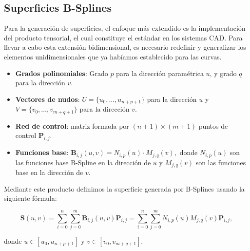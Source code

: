 \documentclass[11pt]{book}
\theoremstyle{plain} %
\theoremstyle{definition} %
\theoremstyle{definition} %
\begin{document}
\vspace{-0.5cm}

\subsection{Superficies B-Splines}
\label{subsec:Sup_B-Splines}

Para la generación de superficies, el enfoque más extendido es la implementación del producto tensorial, el cual constituye
el estándar en los sistemas CAD. Para llevar a cabo esta extensión bidimensional, es necesario redefinir y generalizar
los elementos unidimensionales que ya habíamos establecido para las curvas.

\vspace{-0.2cm}

    \begin{itemize}
        \item \textbf{Grados polinomiales}: Grado $p$ para la dirección paramétrica $u$, y grado $q$ para la dirección $v$.
        \item \textbf{Vectores de nudos}: $U = \{u_0, \dots, u_{n+p+1}\}$ para la dirección $u$ y $V = \{v_0, \dots, v_{m+q+1}\}$ para la dirección $v$.
        \item \textbf{Red de control}: matriz formada por $(n+1) \times (m+1)$ puntos de control $\mathbf{P}_{i,j}$.
        \item \textbf{Funciones base}: $\mathbf{B}_{i,j}(u, v) = N_{i,p}(u) \cdot M_{j,q}(v),$ donde  $N_{i,p}(u)$ son las funciones 
        base B-Spline en la dirección de $u$ y $M_{j,q}(v)$ son las funciones base en la dirección de $v$.
    \end{itemize}


Mediante este producto definimos la superficie generada por B-Splines usando la siguiente fórmula:

\vspace{-0.2cm}

\begin{equation*}
    \mathbf{S}(u, v)= \sum_{i=0}^{n} \sum_{j=0}^{m} \mathbf{B}_{i,j}(u, v) \mathbf{P}_{i,j} = \sum_{i=0}^{n} \sum_{j=0}^{m} N_{i,p}(u) M_{j,q}(v) \mathbf{P}_{i,j},
\end{equation*}

donde $u \in [u_0, u_{n+p+1}]$ y $v \in [v_0, v_{m+q+1}]$.


\vspace{-0.3cm}
\end{document}
